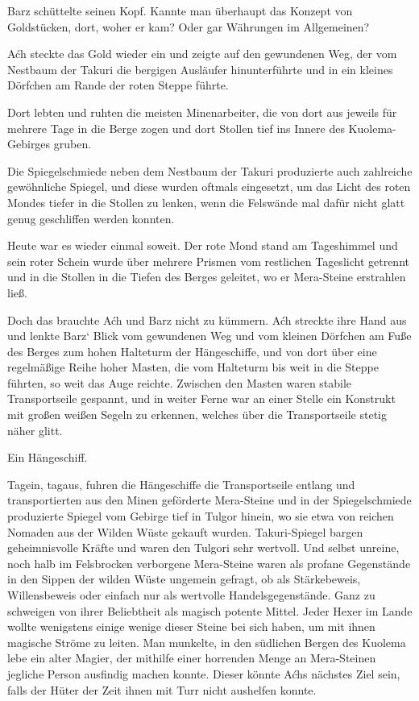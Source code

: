 Barz schüttelte seinen Kopf. Kannte man überhaupt das Konzept von Goldstücken, dort, woher er kam? Oder gar Währungen im Allgemeinen?

Aćh steckte das Gold wieder ein und zeigte auf den gewundenen Weg, der vom Nestbaum der Takuri die bergigen Ausläufer hinunterführte und in ein kleines Dörfchen am Rande der roten Steppe führte.

Dort lebten und ruhten die meisten Minenarbeiter, die von dort aus jeweils für mehrere Tage in die Berge zogen und dort Stollen tief ins Innere des Kuolema-Gebirges gruben.

Die Spiegelschmiede neben dem Nestbaum der Takuri produzierte auch zahlreiche gewöhnliche Spiegel, und diese wurden oftmals eingesetzt, um das Licht des roten Mondes tiefer in die Stollen zu lenken, wenn die Felswände mal dafür nicht glatt genug geschliffen werden konnten.

Heute war es wieder einmal soweit. Der rote Mond stand am Tageshimmel und sein roter Schein wurde über mehrere Prismen vom restlichen Tageslicht getrennt und in die Stollen in die Tiefen des Berges geleitet, wo er Mera-Steine erstrahlen ließ.

Doch das brauchte Aćh und Barz nicht zu kümmern. Aćh streckte ihre Hand aus und lenkte Barz‘ Blick vom gewundenen Weg und vom kleinen Dörfchen am Fuße des Berges zum hohen Halteturm der Hängeschiffe, und von dort über eine regelmäßige Reihe hoher Masten, die vom Halteturm bis weit in die Steppe führten, so weit das Auge reichte. Zwischen den Masten waren stabile Transportseile gespannt, und in weiter Ferne war an einer Stelle ein Konstrukt mit großen weißen Segeln zu erkennen, welches über die Transportseile stetig näher glitt.

Ein Hängeschiff.

Tagein, tagaus, fuhren die Hängeschiffe die Transportseile entlang und transportierten aus den Minen geförderte Mera-Steine und in der Spiegelschmiede produzierte Spiegel vom Gebirge tief in Tulgor hinein, wo sie etwa von reichen Nomaden aus der Wilden Wüste gekauft wurden. Takuri-Spiegel bargen geheimnisvolle Kräfte und waren den Tulgori sehr wertvoll. Und selbst unreine, noch halb im Felsbrocken verborgene Mera-Steine waren als profane Gegenstände in den Sippen der wilden Wüste ungemein gefragt, ob als Stärkebeweis, Willensbeweis oder einfach nur als wertvolle Handelsgegenstände. Ganz zu schweigen von ihrer Beliebtheit als magisch potente Mittel. Jeder Hexer im Lande wollte wenigstens einige wenige dieser Steine bei sich haben, um mit ihnen magische Ströme zu leiten. Man munkelte, in den südlichen Bergen des Kuolema lebe ein alter Magier, der mithilfe einer horrenden Menge an Mera-Steinen jegliche Person ausfindig machen konnte. Dieser könnte Aćhs nächstes Ziel sein, falls der Hüter der Zeit ihnen mit Turr nicht aushelfen konnte.

